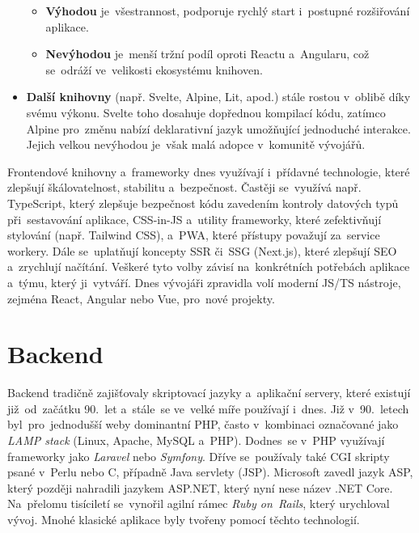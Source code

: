 \begin{itemize}
        \begin{itemize}
            \item \textbf{Výhodou} je~všestrannost, podporuje rychlý start
                i~postupné rozšiřování aplikace.
                \cite{YHVfLHsNlUItkF6G,1WL9hIh67tHjtVTy}
            \item \textbf{Nevýhodou} je~menší tržní podíl oproti Reactu
                a~Angularu, což se~odráží ve~velikosti ekosystému knihoven.
                \cite{YHVfLHsNlUItkF6G,1WL9hIh67tHjtVTy}
        \end{itemize}
    \item \textbf{Další knihovny} (např. Svelte, Alpine, Lit, apod.)
        stále rostou v~oblibě díky svému výkonu. Svelte toho dosahuje
        dopřednou kompilací kódu, zatímco Alpine pro~změnu nabízí
        deklarativní jazyk umožňující jednoduché interakce. Jejich velkou
        nevýhodou je~však malá adopce v~komunitě vývojářů.
\end{itemize}

Frontendové knihovny a~frameworky dnes využívají i~přídavné technologie,
které zlepšují škálovatelnost, stabilitu a~bezpečnost. Častěji se~využívá
např. TypeScript, který zlepšuje bezpečnost kódu zavedením kontroly
datových typů při~sestavování aplikace, CSS-in-JS a~utility frameworky,
které zefektivňují stylování (např. Tailwind CSS), a~PWA, které přístupy
považují za~service workery. Dále se~uplatňují koncepty SSR či~SSG (Next.js),
které zlepšují SEO a~zrychlují načítání. Veškeré tyto volby závisí
na~konkrétních potřebách aplikace a~týmu, který ji~vytváří. Dnes vývojáři
zpravidla volí moderní JS/TS nástroje, zejména React, Angular nebo Vue,
pro~nové projekty.

\section{Backend}
\label{sec:research-backend}

Backend tradičně zajišťovaly skriptovací jazyky a~aplikační servery,
které existují již~od~začátku 90.~let a~stále~se ve~velké míře používají
i~dnes. Již v~90.~letech byl~pro~jednodušší weby dominantní PHP,
často v~kombinaci označované jako \emph{LAMP stack} (Linux, Apache, MySQL
a~PHP). Dodnes~se v~PHP využívají frameworky jako \emph{Laravel} nebo
\emph{Symfony}. Dříve se~používaly také CGI skripty psané v~Perlu nebo C,
případně Java servlety (JSP). Microsoft zavedl jazyk ASP, který později
nahradili jazykem ASP.NET, který nyní nese název .NET Core. Na~přelomu
tisíciletí se~vynořil agilní rámec \emph{Ruby on~Rails}, který urychloval
vývoj. Mnohé klasické aplikace byly tvořeny pomocí těchto technologií.

